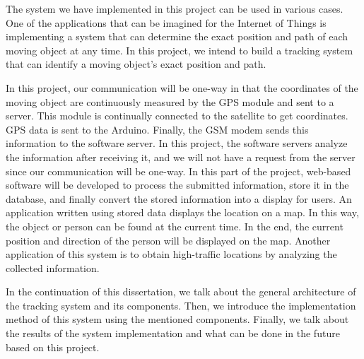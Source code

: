 The system we have implemented in this project can be used in various cases. One of the applications that can be imagined for the Internet of Things is implementing a system that can determine the exact position and path of each moving object at any time. In this project, we intend to build a tracking system that can identify a moving object's exact position and path.

In this project, our communication will be one-way in that the coordinates of the moving object are continuously measured by the GPS module and sent to a server. This module is continually connected to the satellite to get coordinates. GPS data is sent to the Arduino. Finally, the GSM modem sends this information to the software server. In this project, the software servers analyze the information after receiving it, and we will not have a request from the server since our communication will be one-way. In this part of the project, web-based software will be developed to process the submitted information, store it in the database, and finally convert the stored information into a display for users. An application written using stored data displays the location on a map. In this way, the object or person can be found at the current time. In the end, the current position and direction of the person will be displayed on the map. Another application of this system is to obtain high-traffic locations by analyzing the collected information.

In the continuation of this dissertation, we talk about the general architecture of the tracking system and its components. Then, we introduce the implementation method of this system using the mentioned components. Finally, we talk about the results of the system implementation and what can be done in the future based on this project.
